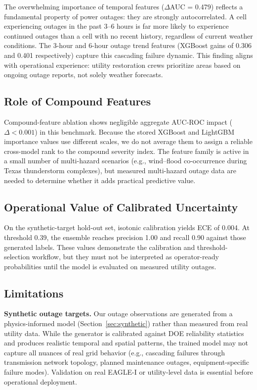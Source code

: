 \documentclass[conference]{IEEEtran}
\begin{document}
The overwhelming importance of temporal features ($\Delta$AUC = 0.479) reflects a fundamental property of power outages: they are strongly autocorrelated. A cell experiencing outages in the past 3--6 hours is far more likely to experience continued outages than a cell with no recent history, regardless of current weather conditions. The 3-hour and 6-hour outage trend features (XGBoost gains of 0.306 and 0.401 respectively) capture this cascading failure dynamic. This finding aligns with operational experience: utility restoration crews prioritize areas based on ongoing outage reports, not solely weather forecasts.

\subsection{Role of Compound Features}

Compound-feature ablation shows negligible aggregate AUC-ROC impact ($\Delta < 0.001$) in this benchmark. Because the stored XGBoost and LightGBM importance values use different scales, we do not average them to assign a reliable cross-model rank to the compound severity index. The feature family is active in a small number of multi-hazard scenarios (e.g., wind--flood co-occurrence during Texas thunderstorm complexes), but measured multi-hazard outage data are needed to determine whether it adds practical predictive value.

\subsection{Operational Value of Calibrated Uncertainty}

On the synthetic-target hold-out set, isotonic calibration yields ECE of 0.004. At threshold 0.39, the ensemble reaches precision 1.00 and recall 0.90 against those generated labels. These values demonstrate the calibration and threshold-selection workflow, but they must not be interpreted as operator-ready probabilities until the model is evaluated on measured utility outages.

\subsection{Limitations}

\textbf{Synthetic outage targets.} Our outage observations are generated from a physics-informed model (Section~\ref{sec:synthetic}) rather than measured from real utility data. While the generator is calibrated against DOE reliability statistics and produces realistic temporal and spatial patterns, the trained model may not capture all nuances of real grid behavior (e.g., cascading failures through transmission network topology, planned maintenance outages, equipment-specific failure modes). Validation on real EAGLE-I or utility-level data is essential before operational deployment.
\end{document}
